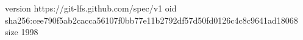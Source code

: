 version https://git-lfs.github.com/spec/v1
oid sha256:cee790f5ab2cacca56107f0bb77e11b2792df57d50fd0126c4c8c9641ad18068
size 1998
